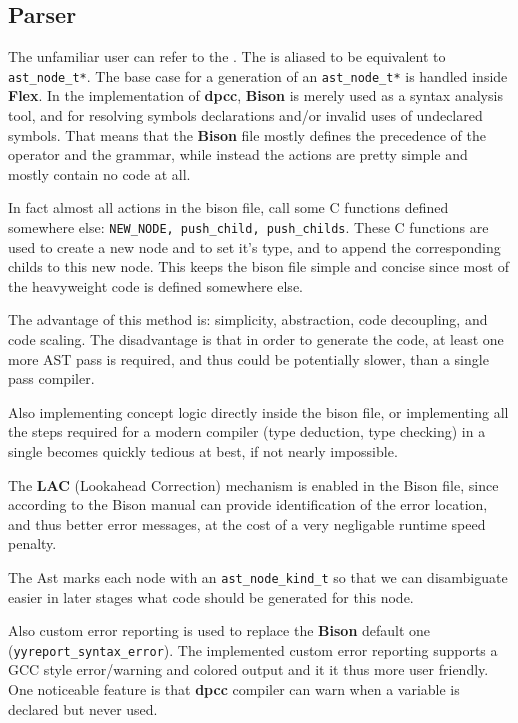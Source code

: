 \documentclass[a4paper]{article}
\newcommand{\urlref}[3][blue]{\href{#2}{\color{#1}{#3}}}%
\begin{document}
\subsection{Parser}
The unfamiliar user can refer to the \urlref{https://www.gnu.org/software/bison/manual/bison.html}{Bison manual}.
The  is aliased to be equivalent to \texttt{ast\_node\_t*}. The base case for a generation of an
\texttt{ast\_node\_t*} is handled inside \textbf{Flex}. In the implementation of \textbf{dpcc}, \textbf{Bison}
is merely used as a syntax analysis tool, and for resolving symbols declarations and/or invalid uses of undeclared symbols.
That means that the \textbf{Bison} file mostly defines the precedence of the operator and the grammar, while instead
the actions are pretty simple and mostly contain no code at all.

In fact almost all actions in the bison file, call some C functions defined somewhere else: \texttt{NEW\_NODE, push\_child, push\_childs}.
These C functions are used to create a new node and to set it's type, and to append the corresponding childs to this new node.
This keeps the bison file simple and concise since most of the heavyweight code is defined somewhere else.

The advantage of this method is: simplicity, abstraction, code decoupling, and code scaling. The disadvantage is that in order
to generate the code, at least one more AST pass is required, and thus could be potentially slower, than a single
pass compiler.

Also implementing concept logic directly inside the bison file, or implementing all the steps required for a modern
compiler (type deduction, type checking) in a single becomes quickly tedious at best, if not nearly impossible.

The \textbf{LAC} (Lookahead Correction) mechanism is enabled in the Bison file, since according to the Bison manual can provide
identification of the error location, and thus better error messages, at the cost of a very negligable runtime speed penalty.

The Ast marks each node with an \texttt{ast\_node\_kind\_t} so that we can disambiguate easier in later
stages what code should be generated for this node.

Also custom error reporting is used to replace the \textbf{Bison} default one (\texttt{yyreport\_syntax\_error}). The implemented custom error reporting
supports a GCC style error/warning and colored output and it it thus more user friendly.
One noticeable feature is that \textbf{dpcc} compiler can warn when a variable is declared but never used.
\end{document}
